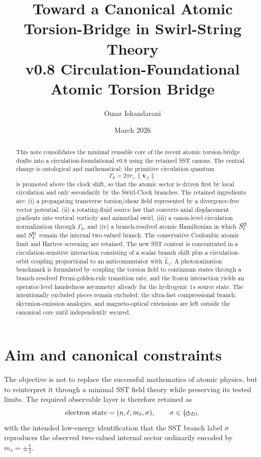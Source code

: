 \documentclass[11pt,a4paper]{article}
\title{Toward a Canonical Atomic Torsion-Bridge in Swirl-String Theory\\
\large v0.8 Circulation-Foundational Atomic Torsion Bridge}
\author{Omar Iskandarani}
\date{March 2026}
\newcommand{\swirlarrow}{\mathchoice{\mkern-2mu\scriptstyle\boldsymbol{\circlearrowleft}}{\mkern-2mu\scriptstyle\boldsymbol{\circlearrowleft}}{\mkern-2mu\scriptscriptstyle\boldsymbol{\circlearrowleft}}{\mkern-2mu\scriptscriptstyle\boldsymbol{\circlearrowleft}}}
\newcommand{\swirlarrowcw}{\mathchoice{\mkern-2mu\scriptstyle\boldsymbol{\circlearrowright}}{\mkern-2mu\scriptstyle\boldsymbol{\circlearrowright}}{\mkern-2mu\scriptscriptstyle\boldsymbol{\circlearrowright}}{\mkern-2mu\scriptscriptstyle\boldsymbol{\circlearrowright}}}
\newcommand{\SwirlClock}{S_t^{\swirlarrow}}
\newcommand{\SwirlClockcw}{S_t^{\swirlarrowcw}}
\begin{document}
\maketitle

\begin{abstract}
This note consolidates the minimal reusable core of the recent atomic torsion-bridge drafts into a circulation-foundational v0.8 using the retained SST canons. The central change is ontological and mathematical: the primitive circulation quantum
\[
\Gamma_0 = 2\pi r_c\,\lVert \mathbf{v}_{\!\boldsymbol{\circlearrowleft}}\rVert
\]
is promoted above the clock shift, so that the atomic sector is driven first by local circulation and only secondarily by the Swirl-Clock branches. The retained ingredients are: (i) a propagating transverse torsion/shear field represented by a divergence-free vector potential, (ii) a rotating-fluid source law that converts axial displacement gradients into vertical vorticity and azimuthal swirl, (iii) a canon-level circulation normalization through $\Gamma_0$, and (iv) a branch-resolved atomic Hamiltonian in which $\SwirlClock$ and $\SwirlClockcw$ remain the internal two-valued branch. The conservative Coulombic atomic limit and Hartree screening are retained. The new SST content is concentrated in a circulation-sensitive interaction consisting of a scalar branch shift plus a circulation-orbit coupling proportional to an anticommutator with $\hat L_z$. A photoionization benchmark is formulated by coupling the torsion field to continuum states through a branch-resolved Fermi-golden-rule transition rate, and the frozen interaction yields an operator-level handedness asymmetry already for the hydrogenic $1s$ source state. The intentionally excluded pieces remain excluded: the ultra-fast compressional branch, skyrmion-emission analogies, and magneto-optical extensions are left outside the canonical core until independently secured.
\end{abstract}

\section{Aim and canonical constraints}
The objective is not to replace the successful mathematics of atomic physics, but to reinterpret it through a minimal SST field theory while preserving its tested limits. The required observable layer is therefore retained as
\begin{equation}
\label{eq:state-labels}
\text{electron state}=(n,\ell,m_\ell,\sigma),
\qquad
\sigma\in\{\swirlarrow,\swirlarrowcw\},
\end{equation}
with the intended low-energy identification that the SST branch label $\sigma$ reproduces the observed two-valued internal sector ordinarily encoded by $m_s=\pm \tfrac12$.
\end{document}
